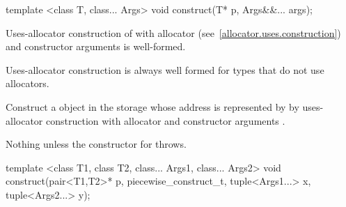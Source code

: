 %
\begin{itemdecl}
template <class T, class... Args>
  void construct(T* p, Args&&... args);
\end{itemdecl}

\begin{itemdescr}
\pnum
\requires
Uses-allocator construction of 
with allocator  (see~\ref{allocator.uses.construction})
and constructor arguments  is well-formed.
\begin{note}
Uses-allocator construction is always well formed
for types that do not use allocators.\end{note}

\pnum
\effects
Construct a  object in the storage
whose address is represented by 
by uses-allocator construction with allocator 
and constructor arguments .

\pnum
\throws
Nothing unless the constructor for  throws.
\end{itemdescr}

%
\begin{itemdecl}
template <class T1, class T2, class... Args1, class... Args2>
  void construct(pair<T1,T2>* p, piecewise_construct_t,
                 tuple<Args1...> x, tuple<Args2...> y);
\end{itemdecl}

